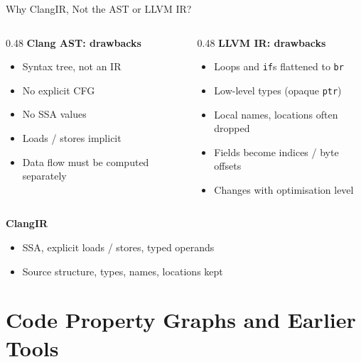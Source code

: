 \documentclass[aspectratio=169,10pt]{beamer}
\newcommand{\code}[1]{\texttt{#1}}
\begin{document}
\begin{frame}{Why ClangIR, Not the AST or LLVM IR?}
  \begin{columns}[T]
    \begin{column}{0.48\textwidth}
      \textbf{Clang AST: drawbacks}
      \begin{itemize}
        \item Syntax tree, not an IR
        \item No explicit CFG
        \item No SSA values
        \item Loads / stores implicit
        \item Data flow must be computed separately
      \end{itemize}
    \end{column}
    \begin{column}{0.48\textwidth}
      \textbf{LLVM IR: drawbacks}
      \begin{itemize}
        \item Loops and \code{if}s flattened to \code{br}
        \item Low-level types (opaque \code{ptr})
        \item Local names, locations often dropped
        \item Fields become indices / byte offsets
        \item Changes with optimisation level
      \end{itemize}
    \end{column}
  \end{columns}

  \vspace{1.2em}
  \textbf{ClangIR}
  \begin{itemize}
    \item SSA, explicit loads / stores, typed operands
    \item Source structure, types, names, locations kept
  \end{itemize}
\end{frame}

\section{Code Property Graphs and Earlier Tools}
\end{document}
